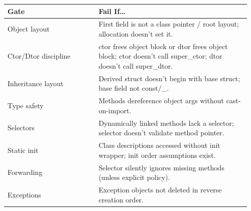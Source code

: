 \documentclass[11pt]{article}
\begin{document}
\begin{tabular}{@{}p{0.36\linewidth}p{0.6\linewidth}@{}}
\toprule
\textbf{Gate} & \textbf{Fail If\ldots} \\
\midrule
Object layout & First field is not a class pointer / root layout; allocation doesn't set it. \\
Ctor/Dtor discipline & ctor frees object block or dtor frees object block; ctor doesn't call super\_ctor; dtor doesn't call super\_dtor. \\
Inheritance layout & Derived struct doesn't begin with base struct; base field not const/\_. \\
Type safety & Methods dereference object args without cast-on-import. \\
Selectors & Dynamically linked methods lack a selector; selector doesn't validate method pointer. \\
Static init & Class descriptions accessed without init wrapper; init order assumptions exist. \\
Forwarding & Selector silently ignores missing methods (unless explicit policy). \\
Exceptions & Exception objects not deleted in reverse creation order. \\
\bottomrule
\end{tabular}
\end{document}
